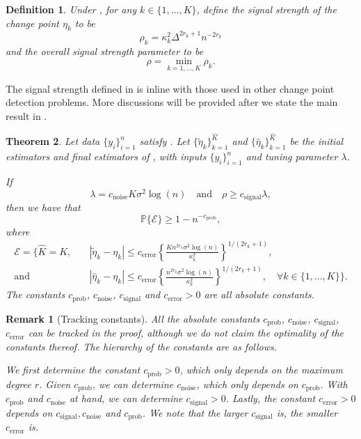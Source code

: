 \documentclass{article}
\newtheorem{theorem}{Theorem}
\newtheorem{definition}[theorem]{Definition}
\newtheorem{remark}{Remark}
\begin{document}
\begin{definition} \label{def-snr}
Under , for any $k \in \{1, \ldots, K\}$, define the signal strength of the change point $\eta_k$ to be
	\[
		\rho_k = \kappa_k^2 \Delta^{2r_k + 1} n^{-2r_k}
	\]
	and the overall signal strength parameter to be
	\[
		\rho = \min_{k = 1, \ldots, K} \rho_k.
	\]
\end{definition}

The signal strength defined in  is inline with those used in other change point detection problems.  More discussions will be provided after we state the main result in .

\begin{theorem}\label{thm}
Let data $\{y_i\}_{i = 1}^n$ satisfy .  Let $\{\widetilde{\eta}_k\}_{k = 1}^{\widehat{K}}$ and $\{\widehat{\eta}_k\}_{k = 1}^{\widehat{K}}$ be the initial estimators and final estimators of , with inputs $\{y_i\}_{i = 1}^n$ and tuning parameter $\lambda$.  

If 
	\begin{equation}\label{eq-snr}
		\lambda = c_{\mathrm{noise}} K \sigma^2 \log(n) \quad \mbox{and} \quad \rho \geq c_{\mathrm{signal}} \lambda, 
	\end{equation}
	then we have that
	\[
		\mathbb{P}\{\mathcal{E}\} \geq 1 - n^{-c_{\mathrm{prob}}},
	\]
	where
	\begin{align*}
		\mathcal{E} = \Bigg\{\widehat{K} = K, & \quad |\widetilde{\eta}_k - \eta_k| \leq c_{\mathrm{error}} \left\{\frac{K n^{2r_k} \sigma^2 \log(n)}{\kappa_k^2}\right\}^{1/(2r_k+1)}, \\
		\mbox{and} & \quad |\widehat{\eta}_k - \eta_k| \leq c_{\mathrm{error}} \left\{\frac{n^{2r_k} \sigma^2 \log(n)}{\kappa_k^2}\right\}^{1/(2r_k+1)}, \quad \forall k \in \{1, \ldots, K\}\Bigg\}.
	\end{align*}
	The constants $c_{\mathrm{prob}}$, $c_{\mathrm{noise}}$, $c_{\mathrm{signal}}$ and $c_{\mathrm{error}} > 0$ are all absolute constants.
\end{theorem}

\begin{remark}[Tracking constants]
All the absolute constants $c_{\mathrm{prob}}$, $c_{\mathrm{noise}}$, $c_{\mathrm{signal}}$, $c_{\mathrm{error}}$ can be tracked in the proof, although we do not claim the optimality of the constants thereof.  The hierarchy of the constants are as follows.  

We first determine the constant $c_{\mathrm{prob}} > 0$, which only depends on the maximum degree $r$.  Given $c_{\mathrm{prob}}$, we can determine $c_{\mathrm{noise}}$, which only depends on $c_{\mathrm{prob}}$.  With $c_{\mathrm{prob}}$ and $c_{\mathrm{noise}}$ at hand, we can determine $c_{\mathrm{signal}} > 0$.  Lastly, the constant $c_{\mathrm{error}} > 0$ depends on $c_{\mathrm{signal}}, c_{\mathrm{noise}}$ and $c_{\mathrm{prob}}$.  We note that the larger $c_{\mathrm{signal}}$ is, the smaller $c_{\mathrm{error}}$ is.  
\end{remark}
\end{document}
